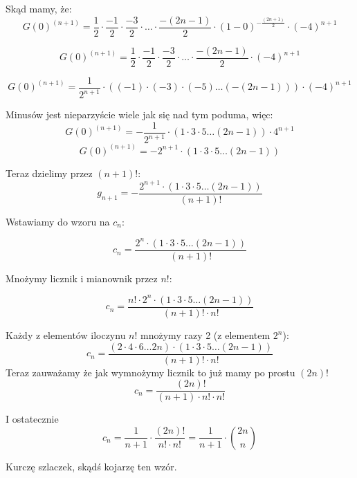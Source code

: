 Skąd mamy, że:
\begin{equation*}
	G(0)^{(n+1)} = \frac{1}{2} \cdot \frac{-1}{2} \cdot \frac{-3}{2} \cdot \dots \cdot \frac{-(2n - 1)}{2} \cdot (1-0)^{- \frac{(2n+1)}{2}} \cdot (-4)^{n+1}
\end{equation*}

\begin{equation*}
	G(0)^{(n+1)} = \frac{1}{2} \cdot \frac{-1}{2} \cdot \frac{-3}{2} \cdot \dots \cdot \frac{-(2n - 1)}{2} \cdot (-4)^{n+1}
\end{equation*}

\begin{equation*}
	G(0)^{(n+1)} = \frac{1}{2^{n+1}} \cdot ( (-1) \cdot (-3) \cdot (-5) \dots (-(2n - 1))) \cdot (-4)^{n+1}
\end{equation*}

Minusów jest nieparzyście wiele jak się nad tym poduma, więc:
\begin{equation*}
	G(0)^{(n+1)} = -\frac{1}{2^{n+1}} \cdot ( 1 \cdot 3 \cdot 5 \dots (2n - 1)) \cdot 4^{n+1}
\end{equation*}
\begin{equation*}
	G(0)^{(n+1)} = - 2^{n+1}  \cdot ( 1 \cdot 3 \cdot 5 \dots (2n - 1))
\end{equation*}

Teraz dzielimy przez \((n+1)!\):
\begin{equation*}
	g_{n+1} = - \frac{  2^{n+1}  \cdot ( 1 \cdot 3 \cdot 5 \dots (2n - 1)) }{(n+1)!}
\end{equation*}

Wstawiamy do wzoru na \(c_n\):

\begin{equation*}
	c_{n} = \frac{  2^n  \cdot ( 1 \cdot 3 \cdot 5 \dots (2n - 1)) }{(n+1)!}
\end{equation*}

Mnożymy licznik i mianownik przez \(n!\):

\begin{equation*}
	c_{n} = \frac{  n! \cdot 2^n  \cdot ( 1 \cdot 3 \cdot 5 \dots (2n - 1)) }{(n+1)! \cdot n!}
\end{equation*}

Każdy z elementów iloczynu \(n!\) mnożymy razy 2 (z elementem \(2^n\)):
\begin{equation*}
	c_{n} = \frac{  (2 \cdot 4 \cdot 6 \dots 2n)  \cdot ( 1 \cdot 3 \cdot 5 \dots (2n - 1)) }{(n+1)! \cdot n!}
\end{equation*}
Teraz zauważamy że jak wymnożymy licznik to już mamy po prostu \((2n)!\)
\begin{equation*}
	c_{n} = \frac{(2n)!}{(n+1) \cdot n! \cdot n!}
\end{equation*}

I ostatecznie
\begin{equation*}
	c_{n} = \frac{1}{n+1} \cdot \frac{(2n)!}{n! \cdot n!} = \frac{1}{n+1} \cdot \binom{2n}{n}
\end{equation*}

Kurczę szlaczek, skądś kojarzę ten wzór.
